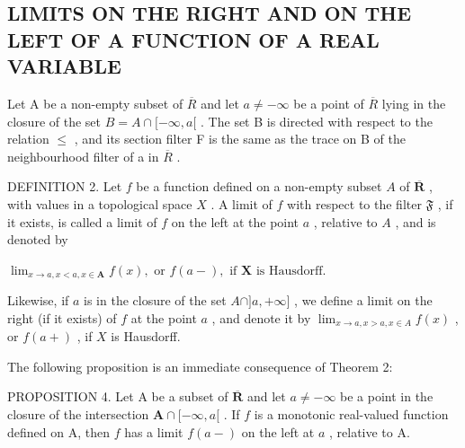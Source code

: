 \subsection{LIMITS ON THE RIGHT AND ON THE LEFT OF A FUNCTION OF A REAL VARIABLE}

Let A be a non-empty subset of \(\overline{R}\) and let \(a \neq -\infty\) be a point of \(\overline{R}\) lying in the closure of the set \(B = A \cap [-\infty, a[\) . The set B is directed with respect to the relation \(\leqslant\) , and its section filter F is the same as the trace on B of the neighbourhood filter of a in \(\overline{R}\) .

DEFINITION 2. Let \(f\) be a function defined on a non-empty subset \(A\) of \(\overline{\mathbf{R}}\) , with values in a topological space \(X\) . A limit of \(f\) with respect to the filter \(\mathfrak{F}\) , if it exists, is called a limit of \(f\) on the left at the point \(a\) , relative to \(A\) , and is denoted by

\(\lim_{x \to a, x < a, x \in \mathbf{A}} f(x), \text{ or } f(a - ), \text{ if } \mathbf{X} \text{ is Hausdorff.}\)

Likewise, if \(a\) is in the closure of the set \(A \cap ]a, +\infty]\) , we define a limit on the right (if it exists) of \(f\) at the point \(a\) , and denote it by \(\lim_{x \to a, x > a, x \in A} f(x)\) , or \(f(a+)\) , if \(X\) is Hausdorff.

The following proposition is an immediate consequence of Theorem 2:

PROPOSITION 4. Let A be a subset of \(\overline{\mathbf{R}}\) and let \(a \neq -\infty\) be a point in the closure of the intersection \(\mathbf{A} \cap [-\infty, a[\) . If \(f\) is a monotonic real-valued function defined on A, then \(f\) has a limit \(f(a - )\) on the left at \(a\) , relative to A.

